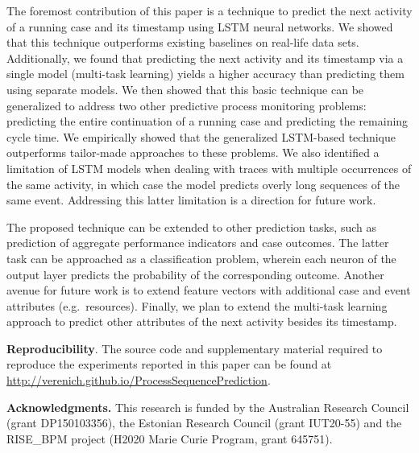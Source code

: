 \documentclass[runningheads,a4paper]{llncs}
\begin{document}
The foremost contribution of this paper is a technique to predict the next activity of a running case and its timestamp using LSTM neural networks. We showed that this technique outperforms existing baselines on real-life data sets. Additionally, we found that predicting the next activity and its timestamp via a single model (multi-task learning) yields a higher accuracy than predicting them using separate models. We then showed that this basic technique can be generalized to address two other predictive process monitoring problems: predicting the entire continuation of a running case and predicting the remaining cycle time. We empirically showed that the generalized LSTM-based technique outperforms tailor-made approaches to these problems. We also identified a limitation of LSTM models when dealing with traces with multiple occurrences of the same activity, in which case the model predicts overly long sequences of the same event. Addressing this latter limitation is a direction for future work. 



The proposed technique can be extended to other prediction tasks, such as prediction of aggregate performance indicators and case outcomes. The latter task can be approached as a classification problem, wherein each neuron of the output layer predicts the probability of the corresponding outcome. Another avenue for future work is to extend feature vectors with additional case and event attributes (e.g.\ resources). Finally, we plan to extend the multi-task learning approach to predict other attributes of the next activity besides its timestamp.



\medskip\noindent\textbf{Reproducibility}. The source code and supplementary material required to reproduce the experiments reported in this paper can be found at \url{http://verenich.github.io/ProcessSequencePrediction}.

\medskip\noindent\textbf{Acknowledgments.} This research is funded by the Australian Research Council (grant DP150103356), the Estonian Research Council (grant IUT20-55) and the RISE{\_}BPM project (H2020 Marie Curie Program, grant 645751).

%
 


\end{document}
